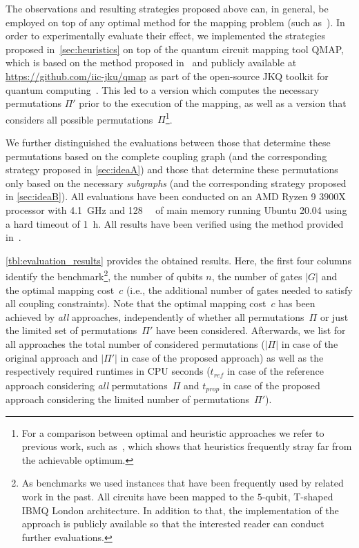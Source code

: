 \documentclass[10pt,conference]{IEEEtran}
\begin{document}
The observations and resulting strategies proposed above can, in general, be employed on top of any optimal method for the mapping problem (such as~\cite{hirataEfficientConversionQuantum2011,siraichiQubitAllocation2018,zhangTimeoptimalQubitMapping2021, tanOptimalLayoutSynthesis2020,dealmeidaFindingOptimalQubit2019,zhuExactQubitAllocation2020, willeMappingQuantumCircuits2019}). 
In order to experimentally evaluate their effect, we implemented the strategies proposed in~\autoref{sec:heuristics} on top of the quantum circuit mapping tool QMAP, which is based on the method proposed in~\cite{willeMappingQuantumCircuits2019} and publicly available at \url{https://github.com/iic-jku/qmap} as part of the open-source JKQ toolkit for quantum computing~\cite{willeJKQJKUTools2020}. 
This led to a version which computes the necessary permutations $\Pi'$ prior to the execution of the mapping, as well as a version that considers all possible \mbox{permutations $\Pi$}\footnote{For a comparison between optimal and heuristic approaches we refer to previous work, such as~\cite{willeMappingQuantumCircuits2019}, which shows that heuristics frequently stray far from the achievable optimum.}.

We further distinguished the evaluations between those that determine these permutations based on the complete coupling graph (and the corresponding strategy proposed in \autoref{sec:ideaA}) and those that determine these permutations only based on the necessary \textit{subgraphs} (and the corresponding strategy proposed in \autoref{sec:ideaB}).
All evaluations have been conducted on an AMD Ryzen 9 3900X processor with \SI{4.1}{\giga\hertz} and \SI{128}{\gibi\byte} of main memory running Ubuntu 20.04 using a hard timeout of \SI{1}{\hour}.
All results have been verified using the method provided in~\cite{burgholzerAdvancedEquivalenceChecking2021}.

\autoref{tbl:evaluation_results} provides the obtained results. 
Here, the first four columns identify the benchmark\footnote{As benchmarks we used instances that have been frequently used by related work in the past. All circuits have been mapped to the $5$-qubit, \mbox{T-shaped} IBMQ London architecture. In addition to that, the implementation of the approach is publicly available so that the interested reader can conduct further evaluations.}, the number of qubits $n$, the number of gates $|G|$ and the optimal mapping cost~$c$ (i.e., the additional number of gates needed to satisfy all coupling constraints). Note that the optimal mapping cost~$c$ has been achieved by \emph{all} approaches, independently of whether all permutations~$\Pi$ or just the limited set of permutations~$\Pi'$ have been considered.
Afterwards, we list for all approaches the total number of considered permutations ($|\Pi|$ in case of the original approach and $|\Pi'|$ in case of the proposed approach) as well as the respectively required runtimes in CPU seconds ($t_\mathit{ref}$ in case of the reference approach considering \emph{all} permutations~$\Pi$ and $t_\mathit{prop}$ in case of the proposed approach considering the limited number of permutations~$\Pi'$). 
\end{document}
